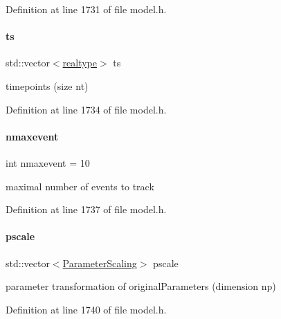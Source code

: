 Definition at line 1731 of file model.\+h.

\mbox{\label{classamici_1_1_model_aa7014a80e7b102f85a10e3b9a480e8e5}} 
\paragraph{\texorpdfstring{ts}{ts}}
{\footnotesize\ttfamily std\+::vector$<$\mbox{\hyperlink{namespaceamici_a1bdce28051d6a53868f7ccbf5f2c14a3}{realtype}}$>$ ts\hspace{0.3cm}{\ttfamily [protected]}}

timepoints (size nt) 

Definition at line 1734 of file model.\+h.

\mbox{\label{classamici_1_1_model_aff0f3f25d886279a90dbf0571956885c}} 
\paragraph{\texorpdfstring{nmaxevent}{nmaxevent}}
{\footnotesize\ttfamily int nmaxevent = 10\hspace{0.3cm}{\ttfamily [protected]}}

maximal number of events to track 

Definition at line 1737 of file model.\+h.

\mbox{\label{classamici_1_1_model_a5d1c7237dc998202fe1b3393b50f77ce}} 
\paragraph{\texorpdfstring{pscale}{pscale}}
{\footnotesize\ttfamily std\+::vector$<$\mbox{\hyperlink{namespaceamici_a42f062082226e9284c201d9eab71a3a0}{Parameter\+Scaling}}$>$ pscale\hspace{0.3cm}{\ttfamily [protected]}}

parameter transformation of {\ttfamily original\+Parameters} (dimension np) 

Definition at line 1740 of file model.\+h.

